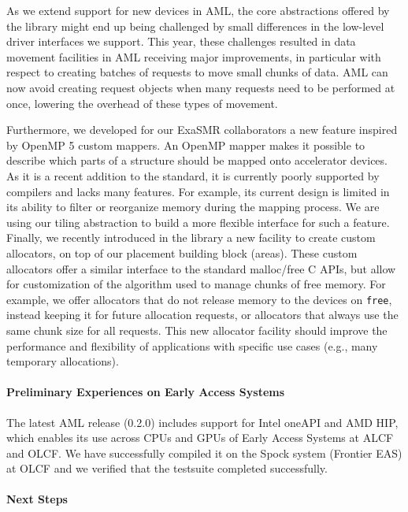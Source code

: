 As we extend support for new devices in AML, the core abstractions offered
by the library might end up being challenged by small differences in the
low-level driver interfaces we support. This year, these challenges
resulted in data movement facilities in AML receiving major improvements,
in particular with respect to creating batches of requests to move small
chunks of data. AML can now avoid creating request objects when many
requests need to be performed at once, lowering the overhead of these types
of movement.

Furthermore, we developed for our ExaSMR collaborators a new feature
inspired by OpenMP 5 custom mappers. An OpenMP mapper makes it
possible to describe which parts of a structure should be mapped onto
accelerator devices. As it is a recent addition to the standard, it is
currently poorly supported by compilers and lacks many features. For
example, its current design is limited in its ability to filter or
reorganize memory during the mapping process. We are using our
tiling abstraction to build a more flexible interface for such a
feature.    Finally, we recently introduced in the library a new facility
to create custom allocators, on top of our placement building block
(areas). These custom allocators offer a similar interface to the standard
malloc/free C APIs, but allow for customization of the algorithm used to
manage chunks of free memory. For example, we offer allocators that do not
release memory to the devices on \texttt{free}, instead keeping it for
future allocation requests, or allocators that always use the same chunk
size for all requests. This new allocator facility should improve the
performance and flexibility of applications with specific use cases (e.g.,
many temporary allocations).

\paragraph{Preliminary Experiences on Early Access Systems}

The latest AML release (0.2.0) includes support for Intel oneAPI and AMD
HIP, which enables its use across CPUs and GPUs of Early Access Systems at
ALCF and OLCF.  We have successfully compiled it on the Spock system
(Frontier EAS) at OLCF and we verified that the testsuite completed
successfully.

\paragraph{Next Steps}

